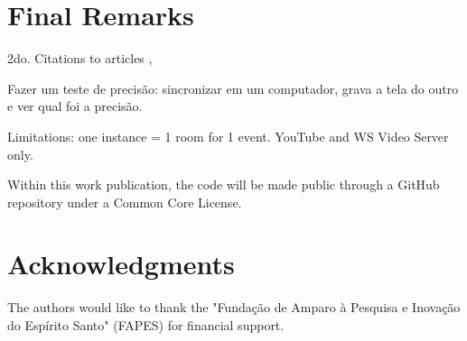 \documentclass{sig-alternate-05-2015}
\begin{document}
\section{Final Remarks}
2do.
Citations to articles \cite{bowman:reasoning,
clark:pct, braams:babel, herlihy:methodology},

Fazer um teste de precisão: sincronizar em um computador, grava a tela do outro e ver qual foi a precisão.

Limitations: one instance = 1 room for 1 event. YouTube and WS Video Server only.

Within this work publication, the code will be made public through a GitHub repository under a Common Core License.

\section{Acknowledgments}
The authors would like to thank the "Fundação de Amparo à Pesquisa e Inovação do Espírito Santo" (FAPES) for financial support.


  
\end{document}
